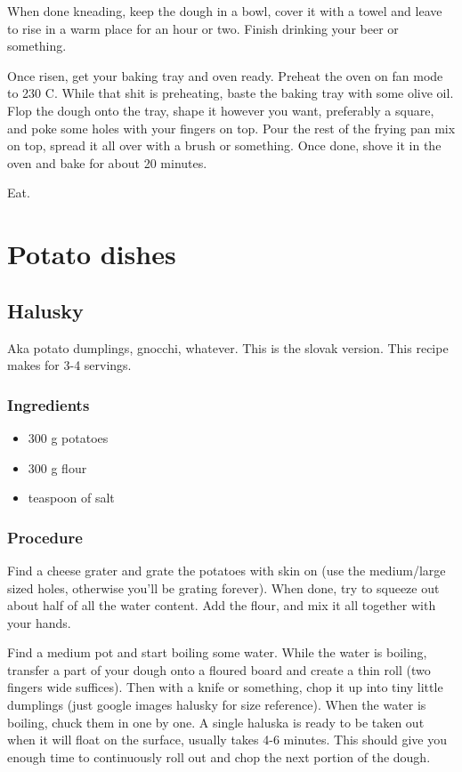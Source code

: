 \documentclass[10pt]{article}
\begin{document}
When done kneading, keep the dough in a bowl, cover it with a towel and leave to rise in a warm place for an hour or two. Finish drinking your beer or something. \par

Once risen, get your baking tray and oven ready. Preheat the oven on fan mode to 230 C. While that shit is preheating, baste the baking tray with some olive oil. Flop the dough onto the tray, shape it however you want, preferably a square, and poke some holes with your fingers on top. Pour the rest of the frying pan mix on top, spread it all over with a brush or something. Once done, shove it in the oven and bake for about 20 minutes. \par

Eat.
\section{Potato dishes}%
\label{sec:potato_dishes}

\subsection{Halusky}%
\label{sub:halusky}

Aka potato dumplings, gnocchi, whatever. This is the slovak version. This recipe makes for 3-4 servings.
\subsubsection{Ingredients}%
\label{ssub:halusky_ingredients}
\begin{itemize}
	\item 300 g potatoes
	\item 300 g flour
	\item teaspoon of salt
\end{itemize}
\subsubsection{Procedure}%
\label{ssub:halusky_procedure}


Find a cheese grater and grate the potatoes with skin on (use the medium/large sized holes, otherwise you'll be grating forever). When done, try to squeeze out about half of all the water content. Add the flour, and mix it all together with your hands.\par

Find a medium pot and start boiling some water. While the water is boiling, transfer a part of your dough onto a floured board and create a thin roll (two fingers wide suffices). Then with a knife or something, chop it up into tiny little dumplings (just google images halusky for size reference). When the water is boiling, chuck them in one by one. A single haluska is ready to be taken out when it will float on the surface, usually takes 4-6 minutes. This should give you enough time to continuously roll out and chop the next portion of the dough.\par
\end{document}
